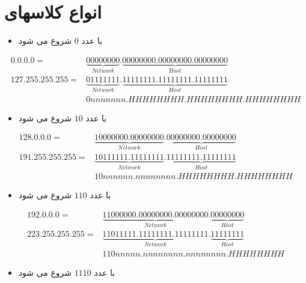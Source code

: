 \documentclass[12pt]{book}
\begin{document}
\section{انواع کلاسهای  }


\begin{itemize}
	\item {} با عدد $0$ شروع می شود 
\end{itemize}

\begin{align*}
 0.  0.  0.  0 = &\underbrace{00000000}_{Network}.\underbrace{00000000.00000000.00000000}_{Host} \\
127.255.255.255 = &\underbrace{01111111}_{Network}.\underbrace{11111111.11111111.11111111}_{Host} \\
                  &0nnnnnnn.HHHHHHHH.HHHHHHHH.HHHHHHHH
\end{align*}



\begin{itemize}
	\item {} با عدد $10$ شروع می شود 
\end{itemize}

\begin{align*}
128.  0.  0.  0 = &\underbrace{10000000.00000000}_{Network}.\underbrace{00000000.00000000}_{Host} \\
191.255.255.255 = &\underbrace{10111111.11111111}_{Network}.\underbrace{11111111.11111111}_{Host} \\
                  &10nnnnnn.nnnnnnnn.HHHHHHHH.HHHHHHHH
\end{align*}



\begin{itemize}
	\item {} با عدد $110$ شروع می شود 
\end{itemize}

\begin{align*}
192.  0.  0.  0 = &\underbrace{11000000.00000000.00000000}_{Network}.\underbrace{00000000}_{Host} \\
223.255.255.255 = &\underbrace{11011111.11111111.11111111}_{Network}.\underbrace{11111111}_{Host} \\
                  &110nnnnn.nnnnnnnn.nnnnnnnn.HHHHHHHH
\end{align*}




\begin{itemize}
	\item {} با عدد $1110$ شروع می شود 
\end{itemize}
\end{document}

